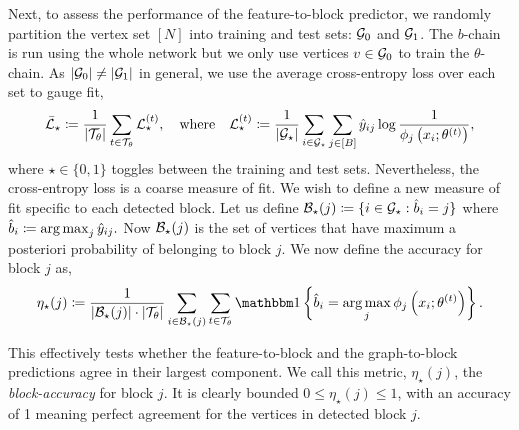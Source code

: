 Next, to assess the performance of the feature-to-block predictor, 
we randomly partition the vertex set $[N]$ into training and test sets: $\mathcal{G}_0$ and $\mathcal{G}_1$.
The $b$-chain is run using the whole network but we only use vertices $v \in \mathcal{G}_0$ to train the $\theta$-chain. As $|\mathcal{G}_0| \neq |\mathcal{G}_1|$ in general, we use the average cross-entropy loss 
over each set to gauge fit,
%
\begin{equation}
	\bar{\mathcal{L}}_\star \coloneqq \frac{1}{|\mathcal{T}_\theta|} \sum_{t \in \mathcal{T}_\theta} \mathcal{L}_\star^{(t)},
	\quad \textrm{where} \quad
	\mathcal{L}_\star^{(t)} \coloneqq \frac{1}{|\mathcal{G}_\star|} \sum_{i \in \mathcal{G}_\star}\sum_{j \in [B]} \hat{y}_{ij} \log \frac{1}{\phi_j \left(x_i; \theta^{(t)} \right)},
	\label{eqn:cross-entropy-loss}
\end{equation}
%
where $\star \in \{0, 1\}$ toggles between the training and test sets.
%
Nevertheless, the cross-entropy loss is a coarse measure of fit. We wish to define a new measure of fit specific to each detected block. Let us define
$
	\mathcal{B}_\star(j) \coloneqq \{i \in \mathcal{G}_\star : \hat{b}_i = j\}
$
where
$ 
	\hat{b}_i \coloneqq \operatorname*{arg\,max}_j \hat{y}_{ij}.
$
Now $\mathcal{B}_\star(j)$ is the set of vertices that have maximum a posteriori probability of belonging to block $j$. We now define the accuracy for block $j$ as,
%
\begin{equation}
	\eta_\star(j) \coloneqq \frac{1}{|\Bcal_\star (j)| \cdot 
	|\Tcal_\theta| } 
	\sum_{i \in \Bcal_\star (j)}  \sum_{t \in \Tcal_\theta}
	\one \left\{\hat{b}_i = \argmax_j \phi_j \left( x_i; \theta^{(t)} \right) \right\}.
	\label{eqn:accuracy}
\end{equation}

This effectively tests whether the feature-to-block and the graph-to-block predictions agree in their largest component. We call this metric, $\eta_\star(j)$, the {\em block-accuracy} for block $j$. It is clearly bounded $0 \leq \eta_\star(j) \leq 1$, with an accuracy of 1 meaning perfect agreement for the vertices in detected block $j$.



